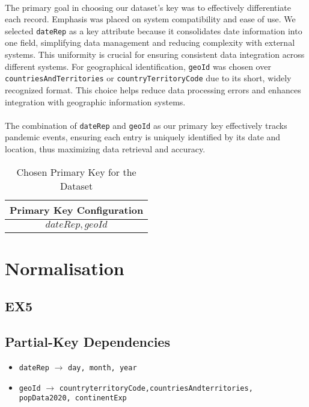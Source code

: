 \documentclass[10pt]{article}
\begin{document}
\paragraph{} The primary goal in choosing our dataset's key was to effectively differentiate each record. Emphasis was placed on system compatibility and ease of use. We selected \texttt{dateRep} as a key attribute because it consolidates date information into one field, simplifying data management and reducing complexity with external systems. This uniformity is crucial for ensuring consistent data integration across different systems. For geographical identification, \texttt{geoId} was chosen over \texttt{countriesAndTerritories} or \texttt{countryTerritoryCode} due to its short, widely recognized format. This choice helps reduce data processing errors and enhances integration with geographic information systems.
\paragraph{} The combination of \texttt{dateRep} and \texttt{geoId} as our primary key effectively tracks pandemic events, ensuring each entry is uniquely identified by its date and location, thus maximizing data retrieval and accuracy. 

\raggedright
\begin{table}[h]
 \caption{Chosen Primary Key for the Dataset}
 \centering 
 \begin{tabular}{|c|} %
  \hline %
  \textbf{Primary Key Configuration} \\ [1ex]
  \hline %
  \(dateRep, geoId\)\\ [1ex] 
  \hline
 \end{tabular}
\end{table}
 



\section{Normalisation}
\subsection{EX5}

\subsection*{Partial-Key Dependencies}
\begin{itemize}
  \item \texttt{dateRep} $\rightarrow$ \texttt{day, month, year}
  \item \texttt{geoId} $\rightarrow$ \texttt{countryterritoryCode,countriesAndterritories, popData2020, continentExp}
\end{itemize}
\end{document}
